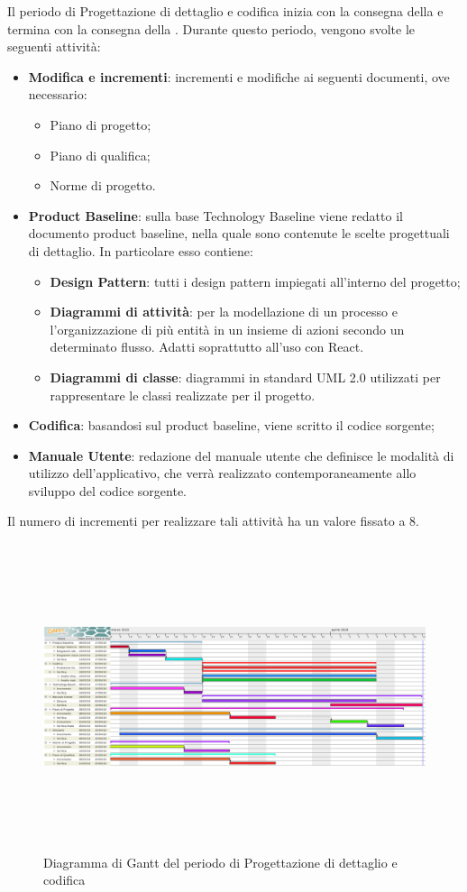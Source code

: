 Il periodo di Progettazione di dettaglio e codifica inizia con la consegna della \RP{} e termina con la consegna della \RQ{}.\newline
Durante questo periodo, vengono svolte le seguenti attività:
\begin{itemize}
	\item \textbf{Modifica e incrementi}: incrementi e modifiche ai seguenti documenti, ove necessario:
	\begin{itemize}
		\item Piano di progetto;
		\item Piano di qualifica;
		\item Norme di progetto.
	\end{itemize}
	\item \textbf{Product Baseline}: sulla base Technology Baseline viene redatto il documento product baseline, 
	nella quale sono contenute le scelte progettuali di dettaglio. In particolare esso contiene:
	\begin{itemize}
		\item {\textbf{Design Pattern}}: tutti i design pattern impiegati all'interno del progetto;
		\item \textbf{Diagrammi di attività}: per la modellazione di un processo e l'organizzazione di più entità in un insieme di azioni secondo un determinato flusso. Adatti soprattutto all'uso con {React}.
		\item  \textbf{Diagrammi di classe}: diagrammi in standard UML 2.0 utilizzati per rappresentare le classi realizzate per il progetto.
	\end{itemize}
	\item \textbf{Codifica}: basandosi sul product baseline, viene scritto il codice sorgente;
	\item \textbf{Manuale Utente}: redazione del manuale utente che definisce le modalità di utilizzo dell'applicativo, che verrà realizzato contemporaneamente allo sviluppo del codice sorgente. 
\end{itemize}
Il numero di incrementi per realizzare tali attività ha un valore fissato a 8.
\begin{figure}[H]
	\centering
	\hspace*{-1.5cm}
	\includegraphics[width=19.4cm, height=9cm]{Pianificazione/progettazioneDettaglioCodifica.pdf}
	\caption{Diagramma di Gantt del periodo di Progettazione di dettaglio e codifica}
\end{figure}